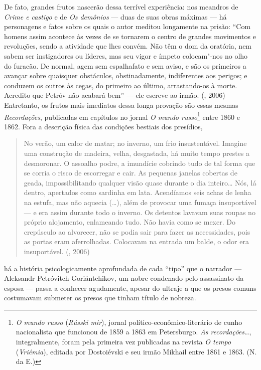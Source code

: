 De fato, grandes frutos nascerão dessa terrível
experiência: nos meandros de \emph{Crime e castigo} e de \emph{Os
demônios} --- duas de suas obras máximas --- há personagens e fatos sobre
os quais o autor meditou longamente na prisão: ``Com homens assim
acontece às vezes de se tornarem o centro de grandes movimentos e
revoluções, sendo a atividade que lhes convém. Não têm o dom da
oratória, nem sabem ser instigadores ou líderes, mas seu vigor e ímpeto
colocam"-nos no olho do furacão. De normal, agem sem espalhafato e sem
aviso, e são os primeiros a avançar sobre quaisquer obstáculos,
obstinadamente, indiferentes aos perigos; e conduzem os outros às cegas,
do primeiro ao último, arrastando-os à morte. Acredito que Petróv não
acabará bem'' --- ele escreve ao irmão. (,
2006) Entretanto, os frutos mais imediatos dessa longa provação
são essas mesmas \emph{Recordações}, publicadas em capítulos no
jornal \emph{O mundo russo}\footnote{\emph{O mundo russo}
(\emph{Rússki mir}), jornal político-econômico-literário de
cunho nacionalista que funcionou de 1859 a 1863 em Petersburgo.
\emph{As recordações\ldots{}}, integralmente, foram pela primeira
vez publicadas na revista \emph{O tempo} (\emph{Vriémia}), editada
por Dostoiévski e seu irmão Mikhail entre 1861 e 1863.
(N. da E.)} entre 1860 e 1862. Fora a descrição física das
condições bestiais dos presídios,

\begin{quote}
No verão, um calor de matar; no inverno, um frio insustentável.
Imagine uma construção de madeira, velha, desgastada, há muito tempo
prestes a desmoronar. O assoalho podre, a imundície cobrindo tudo de tal
forma que se corria o risco de escorregar e cair. As pequenas janelas
cobertas de geada, impossibilitando qualquer visão quase durante o dia
inteiro\ldots{} Nós, lá dentro, apertados como sardinha em lata. Acendíamos
seis achas de lenha na estufa, mas não aquecia (\ldots{}), além de provocar
uma fumaça insuportável --- e era assim durante todo o inverno. Os
detentos lavavam suas roupas no próprio alojamento, enlameando tudo. Não
havia como se mexer. Do crepúsculo ao alvorecer, não se podia sair para
fazer as necessidades, pois as portas eram aferrolhadas. Colocavam na
entrada um balde, o odor era insuportável. (, 2006)
\end{quote}

há a história psicologicamente aprofundada de cada ``tipo''
que o narrador --- Aleksandr Petróvitch Goriántchikov, um nobre
condenado pelo assassinato da esposa --- passa a conhecer agudamente, apesar do ultraje a que os presos comuns costumavam submeter os presos que tinham título de nobreza.

